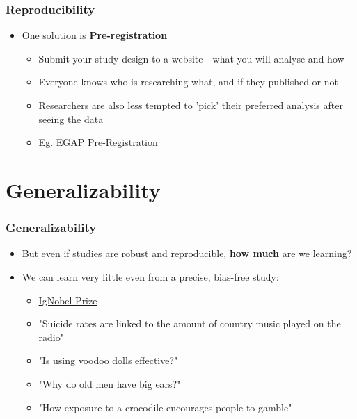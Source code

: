\documentclass[xcolor=x11names,compress]{beamer}\usepackage[]{graphicx}\usepackage[]{color}
\renewcommand{\(}{\begin{columns}}
\renewcommand{\)}{\end{columns}}
\newcommand{\<}[1]{\begin{column}{#1}}
\renewcommand{\>}{\end{column}}
\begin{document}



\begin{frame}
\frametitle{Reproducibility}
\begin{itemize}
\item One solution is \textbf{Pre-registration}
\pause
\begin{itemize}
\item Submit your study design to a website - what you will analyse and how
\pause
\item Everyone knows who is researching what, and if they published or not
\pause
\item Researchers are also less tempted to 'pick' their preferred analysis after seeing the data
\pause
\item Eg. \href{https://egap.org/content/registration}{EGAP Pre-Registration}
\end{itemize}
\end{itemize}
\end{frame}

\section{Generalizability}

\begin{frame}
\frametitle{Generalizability}
\begin{itemize}
\item But even if studies are robust and reproducible, \textbf{how much} are we learning?
\pause
\item We can learn very little even from a precise, bias-free study:
\pause
\begin{itemize}
\item \href{https://www.improbable.com/ig/winners}{IgNobel Prize}
\item "Suicide rates are linked to the amount of country music played on the radio"
\item "Is using voodoo dolls effective?"
\item "Why do old men have big ears?"
\item "How exposure to a crocodile encourages people to gamble"
\end{itemize}
\end{itemize}
\end{frame}
\end{document}
